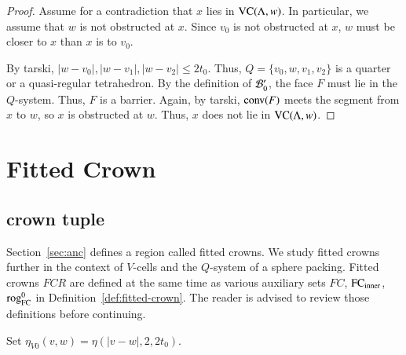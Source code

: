 \begin{proof}
Assume for a contradiction that $x$ lies in ${\operatorname{VC}}(\Lambda,w)$. In
particular, we assume that $w$ is not obstructed at $x$.  Since
$v_0$ is not obstructed at $x$, $w$ must be closer to $x$
than $x$ is to $v_0$.

By tarski, 
   $|w-v_0|,|w-v_1|,|w-v_2|\le 2t_0$.  Thus, $Q=\{v_0,w,v_1,v_2\}$ is
a quarter or a quasi-regular tetrahedron.  By the definition of
${\mathcal B}'_0$, the face $F$ must lie in the $Q$-system.  Thus,
$F$ is a barrier.  Again, by tarski,
${\operatorname{conv}}(F)$ meets the segment from $x$ to $w$, so $x$ is obstructed
at $w$.  Thus, $x$ does not lie in ${\operatorname{VC}}(\Lambda,w)$.
\end{proof}





\section{Fitted Crown}%
    \label{sec:fine-overview}




\subsection{crown tuple}%
    \label{sec:deltaP}

Section~\ref{sec:anc} defines a region called fitted crowns.  We study
fitted crowns further in the context of $V$-cells and the $Q$-system
of a sphere packing.  Fitted crowns $FCR$ are defined at the same time
as various auxiliary sets $FC$, ${\operatorname{FC}}_{\text{inner}}$, ${\operatorname{rog}}^0_{\text{FC}}$ in
Definition~\ref{def:fitted-crown}.  The reader is advised to review those
definitions before continuing.

\begin{definition}\label{def:eta0}
Set $\eta_{V0}(v,w) = \eta(|v-w|,2,2t_0)$. 
\end{definition}




